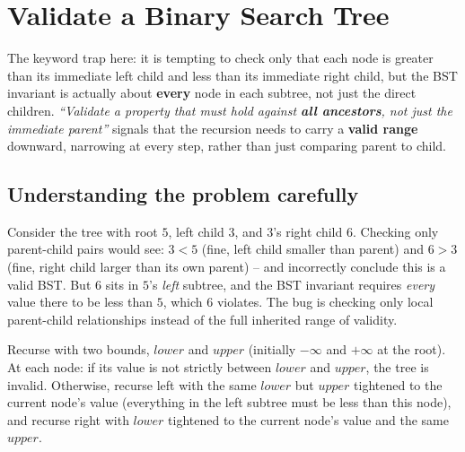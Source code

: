 \section{Validate a Binary Search Tree}
\label{sec:bst-validate}


\begin{patternbox}
The keyword trap here: it is tempting to check only that each node is
greater than its immediate left child and less than its immediate right
child, but the BST invariant is actually about \textbf{every} node in
each subtree, not just the direct children. \emph{``Validate a property
that must hold against \textbf{all ancestors}, not just the immediate
parent''} signals that the recursion needs to carry a \textbf{valid
range} downward, narrowing at every step, rather than just comparing
parent to child.
\end{patternbox}

\subsection*{Understanding the problem carefully}

Consider the tree with root $5$, left child $3$, and $3$'s right child
$6$. Checking only parent-child pairs would see: $3<5$ (fine, left child
smaller than parent) and $6>3$ (fine, right child larger than its own
parent) -- and incorrectly conclude this is a valid BST. But $6$ sits in
$5$'s \emph{left} subtree, and the BST invariant requires \emph{every}
value there to be less than $5$, which $6$ violates. The bug is checking
only local parent-child relationships instead of the full inherited
range of validity.

\begin{ideabox}
Recurse with two bounds, $\textit{lower}$ and $\textit{upper}$
(initially $-\infty$ and $+\infty$ at the root). At each node: if its
value is not strictly between $\textit{lower}$ and $\textit{upper}$,
the tree is invalid. Otherwise, recurse left with the same
$\textit{lower}$ but $\textit{upper}$ tightened to the current node's
value (everything in the left subtree must be less than this node), and
recurse right with $\textit{lower}$ tightened to the current node's
value and the same $\textit{upper}$.
\end{ideabox}

